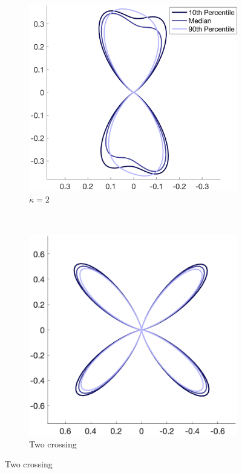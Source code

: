 \begin{figure}
  \begin{subfigure}[]{0.4\textwidth}
    \includegraphics[width=\textwidth]{figures/frf_experiment/fibres_fod_kappa2_b_3000.png}
    \caption{$\kappa = 2$}
  \end{subfigure}
  ~
  \begin{subfigure}[]{0.4\textwidth}
    \includegraphics[width=\textwidth]{figures/frf_experiment/twoperp_fod_b_3000.png}
    \caption{Two crossing}
  \end{subfigure}


\end{figure}

